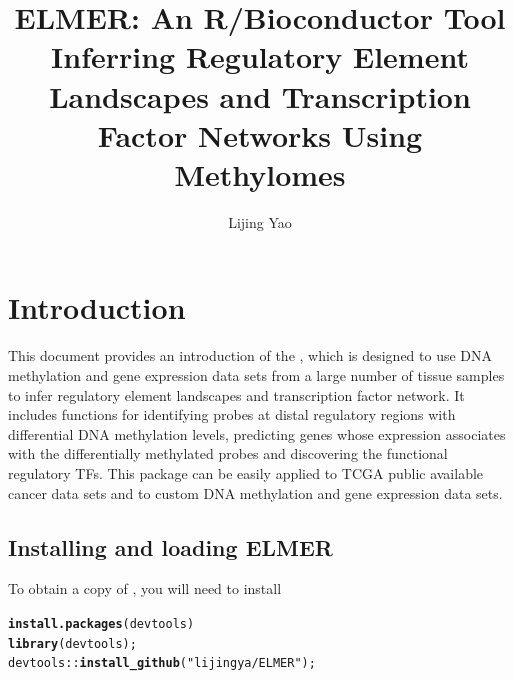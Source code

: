 \documentclass{article}\usepackage[]{graphicx}\usepackage[]{color}
\title{ELMER: An R/Bioconductor Tool \\
Inferring Regulatory Element Landscapes and Transcription Factor Networks Using Methylomes}
\author {Lijing Yao}
\makeatletter
\newcommand{\hlstr}[1]{\textcolor[rgb]{0.192,0.494,0.8}{#1}}%
\newcommand{\hlopt}[1]{\textcolor[rgb]{0,0,0}{#1}}%
\newcommand{\hlstd}[1]{\textcolor[rgb]{0.345,0.345,0.345}{#1}}%
\newcommand{\hlkwd}[1]{\textcolor[rgb]{0.737,0.353,0.396}{\textbf{#1}}}%
\newenvironment{kframe}{%
 \def\at@end@of@kframe{}%
 \ifinner\ifhmode%
  \def\at@end@of@kframe{\end{minipage}}%
  \begin{minipage}{\columnwidth}%
 \fi\fi%
 \def\FrameCommand##1{\hskip\@totalleftmargin \hskip-\fboxsep
 \colorbox{shadecolor}{##1}\hskip-\fboxsep
     \hskip-\linewidth \hskip-\@totalleftmargin \hskip\columnwidth}%
 \MakeFramed {\advance\hsize-\width
   \@totalleftmargin\z@ \linewidth\hsize
   \@setminipage}}%
 {\par\unskip\endMakeFramed%
 \at@end@of@kframe}
\newenvironment{knitrout}{}{} %
\makeatother
\begin{document}
\maketitle

\tableofcontents
\section{Introduction}
This document provides an introduction of the , which is designed 
to use DNA methylation and gene expression data sets from a large number
of tissue samples to infer regulatory element landscapes and transcription factor network.
It includes functions for identifying probes at distal regulatory regions with differential 
DNA methylation levels, predicting genes whose expression associates with the differentially
methylated probes and discovering the functional regulatory TFs. This package can be easily
applied to TCGA public available cancer data sets and to custom DNA methylation 
and gene expression data sets. 

\subsection{Installing and loading ELMER}
To obtain a copy of , you will need to install 
\begin{knitrout}
\color{fgcolor}\begin{kframe}
\begin{alltt}
\hlkwd{install.packages}\hlstd{(devtools)}
\hlkwd{library}\hlstd{(devtools);}
\hlstd{devtools}\hlopt{::}\hlkwd{install_github}\hlstd{(}\hlstr{"lijingya/ELMER"}\hlstd{);}
\end{alltt}
\end{kframe}
\end{knitrout}
\end{document}
